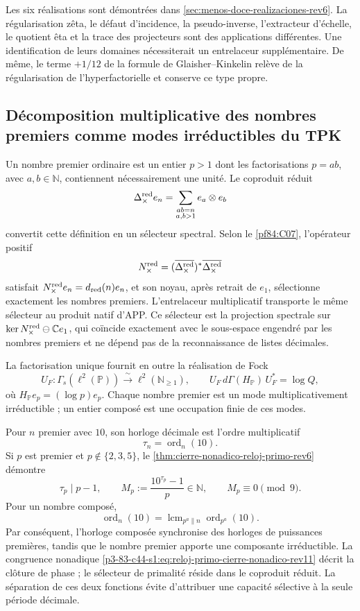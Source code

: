 Les six réalisations sont démontrées dans
\cref{sec:menos-doce-realizaciones-rev6}. La régularisation zêta, le défaut
d'incidence, la pseudo-inverse, l'extracteur d'échelle, le quotient êta et la
trace des projecteurs sont des applications différentes. Une identification de leurs
domaines nécessiterait un entrelaceur supplémentaire. De même, le terme
\(+1/12\) de la formule de Glaisher--Kinkelin relève de la régularisation
de l'hyperfactorielle et conserve ce type propre.

\subsection{Décomposition multiplicative des nombres premiers comme modes irréductibles du TPK}

Un nombre premier ordinaire est un entier \(p>1\) dont les factorisations
\(p=ab\), avec \(a,b\in\mathbb N\), contiennent nécessairement une unité. Le
coproduit réduit
\[
 \Delta_{\times}^{\rm red}e_n
 =\sum_{\substack{ab=n\\a,b>1}}e_a\otimes e_b
\]
convertit cette définition en un sélecteur spectral. Selon le
\cref{pf84:C07}, l'opérateur positif
\[
 N_{\times}^{\rm red}
 =(\overline{\Delta_{\times}^{\rm red}})^*
   \overline{\Delta_{\times}^{\rm red}}
\]
satisfait
\(N_{\times}^{\rm red}e_n=d_{\rm red}(n)e_n\), et son noyau, après
retrait de \(e_1\), sélectionne exactement les nombres premiers. L'entrelaceur
multiplicatif transporte le même sélecteur au produit natif d'APP\@. Ce
sélecteur est la projection spectrale sur
\(\ker N_{\times}^{\rm red}\ominus\mathbb C e_1\), qui coïncide exactement
avec le sous-espace engendré par les nombres premiers et ne dépend pas de la reconnaissance de listes
décimales.

La factorisation unique fournit en outre la réalisation de Fock
\[
 U_F:\Gamma_s(\ell^2(\mathbb P))
 \xrightarrow{\ \sim\ }\ell^2(\mathbb N_{\geq1}),
 \qquad
 U_F\,d\Gamma(H_{\mathbb P})\,U_F^*=\log Q,
\]
où \(H_{\mathbb P}e_p=(\log p)e_p\). Chaque nombre premier est un mode
multiplicativement irréductible ; un entier composé est une occupation finie
de ces modes.

Pour \(n\) premier avec \(10\), son horloge décimale est l'ordre multiplicatif
\[
 \tau_n=\operatorname{ord}_n(10).
\]
Si \(p\) est premier et \(p\notin\{2,3,5\}\), le
\cref{thm:cierre-nonadico-reloj-primo-rev6} démontre
\begin{equation}
 \tau_p\mid p-1,
 \qquad
 M_p:=\frac{10^{\tau_p}-1}{p}\in\mathbb N,
 \qquad
 M_p\equiv0\pmod9.
 \label{p3-83-c44-s1:eq:reloj-primo-cierre-nonadico-rev11}
\end{equation}
Pour un nombre composé,
\[
 \operatorname{ord}_{n}(10)
 =\operatorname{lcm}_{p^a\parallel n}\operatorname{ord}_{p^a}(10).
\]
Par conséquent, l'horloge composée synchronise des horloges de puissances premières, tandis
que le nombre premier apporte une composante irréductible. La congruence nonadique
\eqref{p3-83-c44-s1:eq:reloj-primo-cierre-nonadico-rev11} décrit la clôture de phase ; le
sélecteur de primalité réside dans le coproduit réduit. La séparation de
ces deux fonctions évite d'attribuer une capacité sélective à la seule période décimale.

